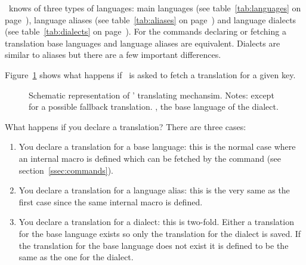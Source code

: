 \documentclass[DIV11,toc=index,toc=bib,numbers=noendperiod]{cnpkgdoc}
\newlength\nodewidth
\begin{document}
\translations\ knows of three types of languages: main languages (see
table~\ref{tab:languages} on page~\pageref{tab:languages}), language aliases
(see table~\ref{tab:aliases} on page~\pageref{tab:aliases}) and language
dialects (see table~\ref{tab:dialects} on page~\pageref{tab:dialects}).  For
the commands declaring or fetching a translation base languages and language
aliases are equivalent.  Dialects are similar to aliases but there are a few
important differences.

Figure~\ref{fig:scheme} shows what happens if \translations\ is asked to fetch
a translation for a given key.

\begin{figure}[htbp]
  \centering
  \caption{Schematic representation of \translations' translating
    mechansim. Notes:  except for a possible fallback
    translation.  \ie, the base language of the dialect.}
  \label{fig:scheme}
\end{figure}

What happens if you declare a translation? There are three cases:
\begin{enumerate}
  \item You declare a translation for a base language: this is the normal case
    where an internal macro is defined which can be fetched by the
     command (see section~\ref{ssec:commands}).
  \item You declare a translation for a language alias: this is the very same
    as the first case since the same internal macro is defined.
  \item You declare a translation for a dialect: this is two-fold.  Either a
    translation for the base language exists so only the translation for the
    dialect is saved.  If the translation for the base language does not exist
    it is defined to be the same as the one for the dialect.
\end{enumerate}
\end{document}
